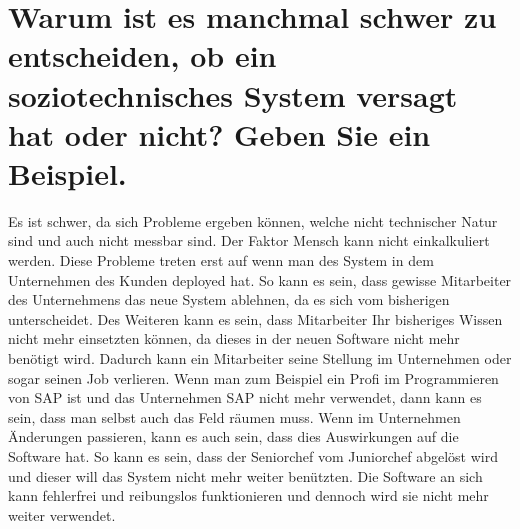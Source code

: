 \documentclass[12pt]{article}
\begin{document}
\section{Warum ist es manchmal schwer zu entscheiden, ob ein soziotechnisches System versagt hat oder nicht?
Geben Sie ein Beispiel.}
\justifying
Es ist schwer, da sich Probleme ergeben können, welche nicht technischer Natur sind und auch nicht messbar sind.
Der Faktor Mensch kann nicht einkalkuliert werden. Diese Probleme treten erst auf wenn man des System in dem Unternehmen des Kunden deployed hat. So kann es sein, dass gewisse Mitarbeiter des Unternehmens das neue System ablehnen, da es sich vom bisherigen unterscheidet. Des Weiteren kann es sein, dass Mitarbeiter Ihr bisheriges Wissen nicht mehr einsetzten können, da dieses in der neuen Software nicht mehr benötigt wird. Dadurch kann ein Mitarbeiter seine Stellung im Unternehmen oder sogar seinen Job verlieren. Wenn man zum Beispiel ein Profi im Programmieren von SAP ist und das Unternehmen SAP nicht mehr verwendet, dann kann es sein, dass man selbst auch das Feld räumen muss. Wenn im Unternehmen Änderungen passieren, kann es auch sein, dass dies Auswirkungen auf die Software hat. So kann es sein, dass der Seniorchef vom Juniorchef abgelöst wird und dieser will das System nicht mehr weiter benützten. Die Software an sich kann fehlerfrei und reibungslos funktionieren und dennoch wird sie nicht mehr weiter verwendet.
\pagebreak
\end{document}
